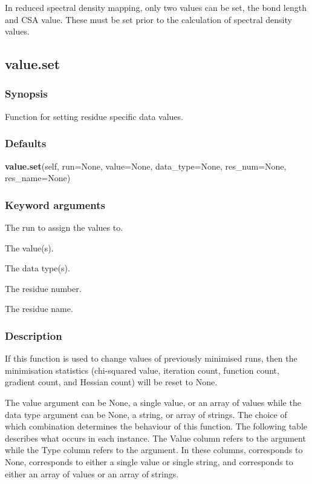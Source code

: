 In reduced spectral density mapping, only two values can be set, the bond length and CSA value.  These must be set prior to the calculation of spectral density values.




\newpage

\subsection{value.set}


\subsubsection{Synopsis}

Function for setting residue specific data values.



\subsubsection{Defaults}

\textsf{\textbf{value.set}(self, run=None, value=None, data\_type=None, res\_num=None, res\_name=None)}


\subsubsection{Keyword arguments}

  The run to assign the values to. 

  The value(s). 

  The data type(s). 

  The residue number. 

  The residue name. 




\subsubsection{Description}

If this function is used to change values of previously minimised runs, then the minimisation statistics (chi-squared value, iteration count, function count, gradient count, and Hessian count) will be reset to None.


The value argument can be None, a single value, or an array of values while the data type argument can be None, a string, or array of strings.  The choice of which combination determines the behaviour of this function.  The following table describes what occurs in each instance.  The Value column refers to the  argument while the Type column refers to the  argument.  In these columns,  corresponds to None,  corresponds to either a single value or single string, and  corresponds to either an array of values or an array of strings.


